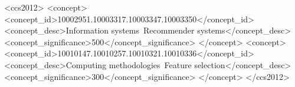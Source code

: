 \author{Carole-Jean Wu}

\author{Julian McAuley}

\renewcommand{\shortauthors}{Sachdeva, Wu, and McAuley}

\begin{abstract}
  
\end{abstract}


\begin{CCSXML}
<ccs2012>
<concept>
<concept_id>10002951.10003317.10003347.10003350</concept_id>
<concept_desc>Information systems~Recommender systems</concept_desc>
<concept_significance>500</concept_significance>
</concept>
<concept>
<concept_id>10010147.10010257.10010321.10010336</concept_id>
<concept_desc>Computing methodologies~Feature selection</concept_desc>
<concept_significance>300</concept_significance>
</concept>
</ccs2012>
\end{CCSXML}




\maketitle

